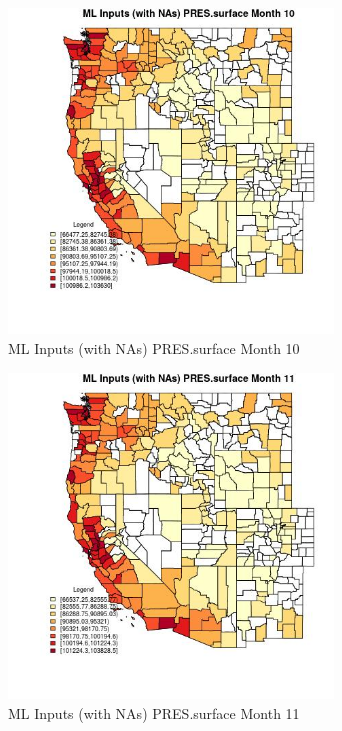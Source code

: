 \begin{figure} 
\centering  
\includegraphics[width=0.77\textwidth]{Code_Outputs/Report_ML_input_PM25_Step4_part_f_de_duplicated_aveswNAs_CountyPRESsurfacemedianMonth10.jpg} 
\caption{\label{fig:Report_ML_input_PM25_Step4_part_f_de_duplicated_aveswNAsCountyPRESsurfacemedianMonth10}ML Inputs (with NAs) PRES.surface Month 10} 
\end{figure} 
 

\begin{figure} 
\centering  
\includegraphics[width=0.77\textwidth]{Code_Outputs/Report_ML_input_PM25_Step4_part_f_de_duplicated_aveswNAs_CountyPRESsurfacemedianMonth11.jpg} 
\caption{\label{fig:Report_ML_input_PM25_Step4_part_f_de_duplicated_aveswNAsCountyPRESsurfacemedianMonth11}ML Inputs (with NAs) PRES.surface Month 11} 
\end{figure} 
 

